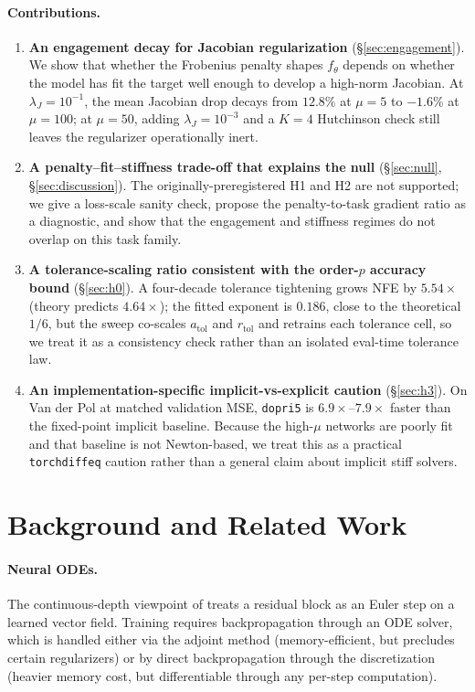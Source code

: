 \documentclass[11pt]{article}
\theoremstyle{plain}
\theoremstyle{definition}
\begin{document}
\paragraph{Contributions.}
\begin{enumerate}[leftmargin=2em]
\item \textbf{An engagement decay for Jacobian regularization} (\S\ref{sec:engagement}).
  We show that whether the Frobenius penalty shapes $f_\theta$ depends
  on whether the model has fit the target well enough to develop a high-norm
  Jacobian. At $\lambda_J = 10^{-1}$, the mean Jacobian drop decays from
  $12.8\%$ at $\mu = 5$ to $-1.6\%$ at $\mu = 100$; at $\mu = 50$, adding
  $\lambda_J = 10^{-3}$ and a $K=4$ Hutchinson check still leaves the
  regularizer operationally inert.
\item \textbf{A penalty--fit--stiffness trade-off that explains the null}
  (\S\ref{sec:null}, \S\ref{sec:discussion}). The originally-preregistered
  H1 and H2 are not supported; we give a loss-scale sanity check, propose the
  penalty-to-task gradient ratio as a diagnostic, and show that the engagement
  and stiffness regimes do not overlap on this task family.
\item \textbf{A tolerance-scaling ratio consistent with the order-$p$ accuracy bound}
  (\S\ref{sec:h0}). A four-decade tolerance tightening grows NFE by $5.54\times$
  (theory predicts $4.64\times$); the fitted exponent is $0.186$, close to the
  theoretical $1/6$, but the sweep co-scales $a_\text{tol}$ and $r_\text{tol}$
  and retrains each tolerance cell, so we treat it as a consistency check
  rather than an isolated eval-time tolerance law.
\item \textbf{An implementation-specific implicit-vs-explicit caution}
  (\S\ref{sec:h3}). On Van der Pol at matched validation MSE,
  \texttt{dopri5} is $6.9\times$--$7.9\times$ faster than the fixed-point
  implicit baseline. Because the high-$\mu$ networks are poorly fit and that
  baseline is not Newton-based, we treat this as a practical
  \texttt{torchdiffeq} caution rather than a general claim about implicit
  stiff solvers.
\end{enumerate}

\section{Background and Related Work}
\label{sec:background}

\paragraph{Neural ODEs.}
The continuous-depth viewpoint of \citet{chen2018neural} treats a residual block
as an Euler step on a learned vector field. Training requires backpropagation
through an ODE solver, which is handled either via the adjoint method
(memory-efficient, but precludes certain regularizers) or by direct
backpropagation through the discretization (heavier memory cost, but
differentiable through any per-step computation).
\end{document}
